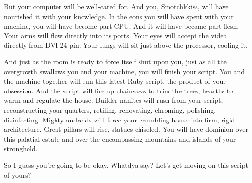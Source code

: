 \documentclass[10pt,twoside]{report}
\begin{document}
But your computer will be well-cared for.  And you, Smotchkkiss, will
have nourished it with your knowledge. In the eons you will have spent
with your machine, you will have become part-CPU.  And it will have
become part-flesh.  Your arms will flow directly into its ports.  Your
eyes will accept the video directly from DVI-24 pin.  Your lungs will
sit just above the processor, cooling it.

And just as the room is ready to force itself shut upon you, just as
all the overgrowth swallows you and your machine, you will finish your
script.  You and the machine together will run this latest Ruby
script, the product of your obsession.  And the script will fire up
chainsaws to trim the trees, hearths to warm and regulate the house.
Builder nanites will rush from your script, reconstructing your
quarters, retiling, renovating, chroming, polishing, disinfecting.
Mighty androids will force your crumbling house into firm, rigid
architecture.  Great pillars will rise, statues chiseled.  You will
have dominion over this palatial estate and over the encompassing
mountains and islands of your stronghold.

So I guess you're going to be okay.  Whatdya say?  Let's get moving on
this script of yours?
\newpage
\thispagestyle{empty}
\mbox{}
\newpage
\thispagestyle{empty}
\mbox{}
\cleartooddpage
\end{document}

